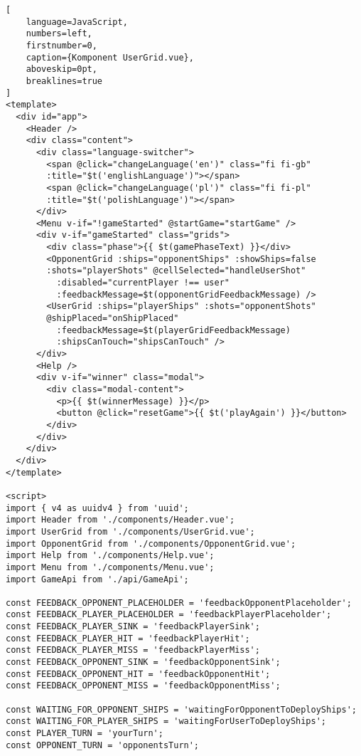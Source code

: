 \begin{addmargin}[0mm]{0mm}
\begin{lstlisting}[
    language=JavaScript,
    numbers=left,
    firstnumber=0,
    caption={Komponent UserGrid.vue},
    aboveskip=0pt,
    breaklines=true
]
<template>
  <div id="app">
    <Header />
    <div class="content">
      <div class="language-switcher">
        <span @click="changeLanguage('en')" class="fi fi-gb"
        :title="$t('englishLanguage')"></span>
        <span @click="changeLanguage('pl')" class="fi fi-pl"
        :title="$t('polishLanguage')"></span>
      </div>
      <Menu v-if="!gameStarted" @startGame="startGame" />
      <div v-if="gameStarted" class="grids">
        <div class="phase">{{ $t(gamePhaseText) }}</div>
        <OpponentGrid :ships="opponentShips" :showShips=false
        :shots="playerShots" @cellSelected="handleUserShot"
          :disabled="currentPlayer !== user"
          :feedbackMessage=$t(opponentGridFeedbackMessage) />
        <UserGrid :ships="playerShips" :shots="opponentShots"
        @shipPlaced="onShipPlaced"
          :feedbackMessage=$t(playerGridFeedbackMessage)
          :shipsCanTouch="shipsCanTouch" />
      </div>
      <Help />
      <div v-if="winner" class="modal">
        <div class="modal-content">
          <p>{{ $t(winnerMessage) }}</p>
          <button @click="resetGame">{{ $t('playAgain') }}</button>
        </div>
      </div>
    </div>
  </div>
</template>

<script>
import { v4 as uuidv4 } from 'uuid';
import Header from './components/Header.vue';
import UserGrid from './components/UserGrid.vue';
import OpponentGrid from './components/OpponentGrid.vue';
import Help from './components/Help.vue';
import Menu from './components/Menu.vue';
import GameApi from './api/GameApi';

const FEEDBACK_OPPONENT_PLACEHOLDER = 'feedbackOpponentPlaceholder';
const FEEDBACK_PLAYER_PLACEHOLDER = 'feedbackPlayerPlaceholder';
const FEEDBACK_PLAYER_SINK = 'feedbackPlayerSink';
const FEEDBACK_PLAYER_HIT = 'feedbackPlayerHit';
const FEEDBACK_PLAYER_MISS = 'feedbackPlayerMiss';
const FEEDBACK_OPPONENT_SINK = 'feedbackOpponentSink';
const FEEDBACK_OPPONENT_HIT = 'feedbackOpponentHit';
const FEEDBACK_OPPONENT_MISS = 'feedbackOpponentMiss';

const WAITING_FOR_OPPONENT_SHIPS = 'waitingForOpponentToDeployShips';
const WAITING_FOR_PLAYER_SHIPS = 'waitingForUserToDeployShips';
const PLAYER_TURN = 'yourTurn';
const OPPONENT_TURN = 'opponentsTurn';


\end{lstlisting}
\end{addmargin}

